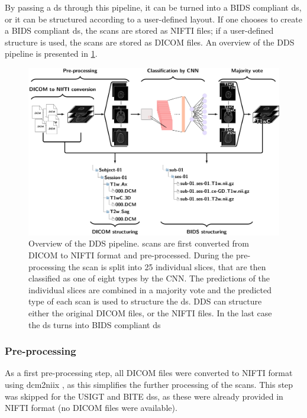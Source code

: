 By passing a \gls{ds} through this pipeline, it can be turned into a \gls{BIDS} compliant \gls{ds}, or it can be structured according to a user-defined layout.
If one chooses to create a \gls{BIDS} compliant \gls{ds}, the \glspl{scan} are stored as \gls{NIFTI} files; if a user-defined structure is used, the \glspl{scan} are stored as \gls{DICOM} files.
An overview of the \gls{DDS} pipeline is presented in \cref{fig:DDS_pipeline}.

\begin{figure}
\centering\includegraphics[width=\textwidth]{Figures/DDS_pipeline.pdf}
\caption{Overview of the \gls{DDS} pipeline.
\Glspl{scan} are first converted from \gls{DICOM} to \gls{NIFTI} format and pre-processed.
During the pre-processing the \gls{scan} is split into \num{25} individual \glspl{slice}, that are then classified as one of eight \glspl{type} by the \gls{CNN}.
The predictions of the individual \glspl{slice} are combined in a majority vote and the predicted \gls{type} of each \gls{scan} is used to structure the \gls{ds}.
\gls{DDS} can structure either the original \gls{DICOM} files, or the \gls{NIFTI} files.
In the last case the \gls{ds} turns into \gls{BIDS} compliant \gls{ds}}\label{fig:DDS_pipeline}

\end{figure}

\subsubsection{Pre-processing}\label{sec:preprocessing}
As a first pre-processing step, all \gls{DICOM} files were converted to \gls{NIFTI} format using dcm2niix \autocite{li2016first}, as this simplifies the further processing of the \glspl{scan}.
This step was skipped for the \gls{USIGT} and \gls{BITE} \glspl{ds}, as these were already provided in \gls{NIFTI} format (no \gls{DICOM} files were available).

